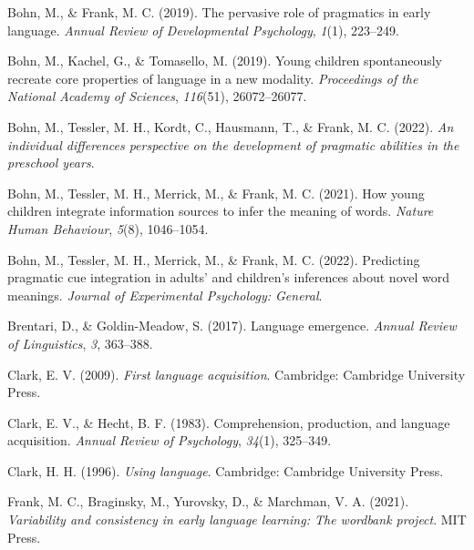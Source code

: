 \documentclass[
  man,floatsintext]{apa6}
\newlength{\cslhangindent}
\newlength{\cslentryspacingunit} %
\newenvironment{CSLReferences}[2] %
 {%
  \setlength{\parindent}{0pt}
  \ifodd #1
  \let\oldpar\par
  \def\par{\hangindent=\cslhangindent\oldpar}
  \fi
  \setlength{\parskip}{#2\cslentryspacingunit}
 }%
 {}
\begin{document}
\hypertarget{refs}{}
\begin{CSLReferences}{1}{0}
\leavevmode{}%
Bohn, M., \& Frank, M. C. (2019). The pervasive role of pragmatics in early language. \emph{Annual Review of Developmental Psychology}, \emph{1}(1), 223--249.

\leavevmode{}%
Bohn, M., Kachel, G., \& Tomasello, M. (2019). Young children spontaneously recreate core properties of language in a new modality. \emph{Proceedings of the National Academy of Sciences}, \emph{116}(51), 26072--26077.

\leavevmode{}%
Bohn, M., Tessler, M. H., Kordt, C., Hausmann, T., \& Frank, M. C. (2022). \emph{An individual differences perspective on the development of pragmatic abilities in the preschool years}.

\leavevmode{}%
Bohn, M., Tessler, M. H., Merrick, M., \& Frank, M. C. (2021). How young children integrate information sources to infer the meaning of words. \emph{Nature Human Behaviour}, \emph{5}(8), 1046--1054.

\leavevmode{}%
Bohn, M., Tessler, M. H., Merrick, M., \& Frank, M. C. (2022). Predicting pragmatic cue integration in adults' and children's inferences about novel word meanings. \emph{Journal of Experimental Psychology: General}.

\leavevmode{}%
Brentari, D., \& Goldin-Meadow, S. (2017). Language emergence. \emph{Annual Review of Linguistics}, \emph{3}, 363--388.

\leavevmode{}%
Clark, E. V. (2009). \emph{First language acquisition}. Cambridge: Cambridge University Press.

\leavevmode{}%
Clark, E. V., \& Hecht, B. F. (1983). Comprehension, production, and language acquisition. \emph{Annual Review of Psychology}, \emph{34}(1), 325--349.

\leavevmode{}%
Clark, H. H. (1996). \emph{Using language}. Cambridge: Cambridge University Press.

\leavevmode{}%
Frank, M. C., Braginsky, M., Yurovsky, D., \& Marchman, V. A. (2021). \emph{Variability and consistency in early language learning: The wordbank project}. MIT Press.


\end{CSLReferences}
\end{document}
